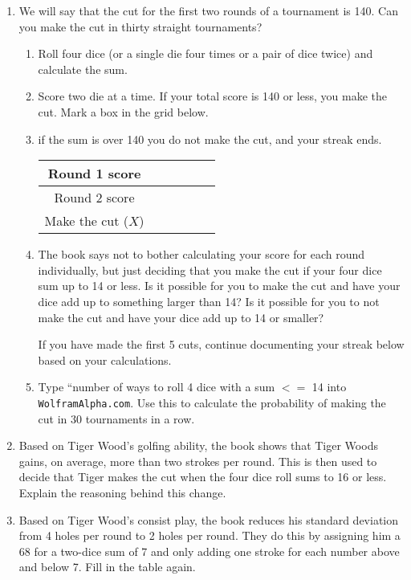 \begin{enumerate}
	\clearpage
	\item We will say that the cut for the first two rounds of a tournament is 140. Can you make the cut in thirty straight tournaments?
	\begin{enumerate}
		\item Roll four dice (or a single die four times or a pair of dice twice) and calculate the sum.
		\item Score two die at a time. If your total score is 140 or less, you make the cut. Mark a box in the grid below.
		\item if the sum is over 140 you do not make the cut, and your streak ends.
		\begin{center} \Large
			\begin{tabular}{c*{5}{|p{1cm}}}\hline
			Round 1 score & & & & &\\\hline
			Round 2 score & & & & &\\\hline
			Make the cut (\(X\)) & & & & &\\\hline
			\end{tabular}\normalsize
			
	\end{center}
	\item The book says not to bother calculating your score for each round individually, but just deciding that you make the cut if your four dice sum up to 14 or less. Is it possible for you to make the cut and have your dice add up to something larger than 14? Is it possible for you to not make the cut and have your dice add up to 14 or smaller?
			
			If you have made the first 5 cuts, continue documenting your streak below based on your calculations.
	\begin{center}
		
		\end{center}
		
		\item Type ``number of ways to roll 4 dice with a sum \(<=\) 14 into \texttt{WolframAlpha.com}. Use this to calculate the probability of making the cut in 30 tournaments in a row. \label{tiger3}
		
	\end{enumerate}
		\item Based on Tiger Wood's golfing ability, the book shows that Tiger Woods gains, on average, more than two strokes per round. This is then used to decide that Tiger makes the cut when the four dice roll sums to 16 or less. Explain the reasoning behind this change. \vfill
		\item Based on Tiger Wood's consist play, the book reduces his standard deviation from 4 holes per round to 2 holes per round. They do this by assigning him a 68 for a two-dice sum of 7 and only adding one stroke for each number above and below 7.  Fill in the table again.
		

\end{enumerate}
